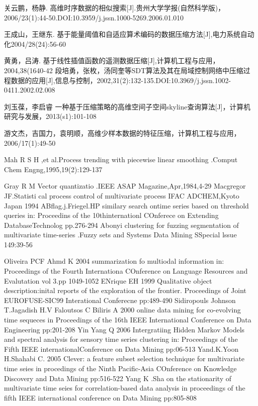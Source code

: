 
\begin{thebibliography}{99}

	关云鹏，杨静.
	高维时序数据的相似搜索[J].贵州大学学报(自然科学版)，2006/23(1):44-50.DOI:10.3959/j.jssn.1000-5269.2006.01.010

	王成山，王继东.
	基于能量阈值和自适应算术编码的数据压缩方法[J],电力系统自动化2004/28(24):56-60

	黄勇，吕涛.
	基于线性插值函数的遥测数据压缩[J],计算机工程与应用，2004,38(1640-42
	段培勇，张枚，汤同奎等SDT算法及其在局域控制网络中压缩过程数据的应用[J],信息与控制，2002,31(2):132-135.DOI:10.3969/j.jssn.1002-
	0411.2002.02.008

	刘玉葆，李启睿
	一种基于压缩策略的高维空间子空间skyline查询算法[J]，计算机研究与发展，2013(s1):101-108

	游文杰，吉国力，袁明顺，高维少样本数据的特征压缩，计算机工程与应用，2006/17(1):49-50

	Mah R S H ,et al.Process trending with piecewise linear smoothing .Comput Chem Engng,1995,19(2):129-137

	Gray R M Vector quantizatio .IEEE ASAP Magazine,Apr,1984,4-29
	Macgregor JF.Statisti cal process control of multivariate process IFAC ADCHEM,Kyoto Japan 1994
	ABflag.j.Friegel.HP similary search ontime series based on threshold queries in: Proceedins of the 10thinternationl COnferece on Extending DatabaseTechnolog pp.276-294
	Abonyi clustering for fuzzing segmentation of multivariate time-series .Fuzzy sets and Systems Data Mining SSpecial lssue 149:39-56

	Oliveira PCF Ahmd K 2004 summarization fo multiodal information in: Proceedings of the Fourth Internationa COnference on Language Resources and Evalutation vol 3.pp 1049-1052
	ENrique EH 1999 Qualitative object description:inital reports of the exploration of the frontier. Proceedings of Joint EUROFUSE-SIC99 Interational Conferecne pp:489-490
	Sidiropouls Johnson T.Jagadish H.V Faloutsos C Biliris A 2000 online data mining for co-evolving time sequeces in Proceedings of the 16th IEEE International Conference on Data Engineering pp:201-208
	Yin Yang Q 2006 Intergratiing Hidden Markov Models and spectral analysis for sensory time series clustering in: Proceedings of the Fifth IEEE internationalConference on Data Mining pp:06-513
	Yand.K.Yoon H.Shahabi C. 2005 Clever: a feature subset selection technique for multivariate time seies in procedings of the Ninth Pacific-Asia COnference on Knowledge Discovery and Data Mining pp:516-522
	Yang K .Sha on the stationarity of multivariate time seies for correlation-based data analysis in proceedings of the fifth IEEE international conference on Data Mining pp:805-808
\end{thebibliography}













